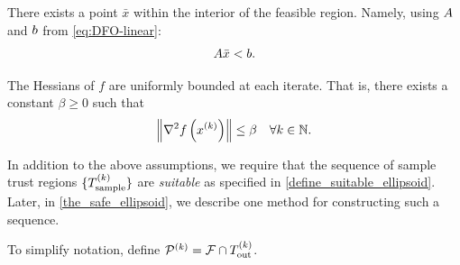 \documentclass{article}
\begin{document}
\begin{assumption}
\label{interior_point}
There exists a point $\bar x$ within the interior of the feasible region.
Namely, using ${A}$ and ${b}$ from \cref{eq:DFO-linear}:
\begin{align}
{A} \bar x < {b}.
\end{align}
\end{assumption}


\begin{assumption}
\label{uniformly_bounded_hessians_of_f}
The Hessians of $f$ are uniformly bounded at each iterate. That is, there exists a constant $\beta \ge 0$ such that
\begin{align*}
\left\|\nabla^2 f\left(x^{(k)}\right)\right\| \le \beta \quad \forall k \in \mathbb N.
\end{align*}
\end{assumption}

In addition to the above assumptions,  we require that the sequence of sample trust regions $\{{T_{\text{sample}}^{(k)}}\}$ are \emph{suitable} as specified in \cref{define_suitable_ellipsoid}.   
  Later, in \cref{the_safe_ellipsoid}, we describe one method for constructing such a sequence.


To simplify notation, define  ${{\mathcal{P}}^{(k)}}={\mathcal F} \cap {T_{\text{out}}^{(k)}}$.
\end{document}
